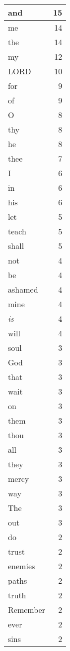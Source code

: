 \begin{center}
\begin{longtable}{l|r}
\hline \hline
\endlastfoot
and & 15 \\ \hline
me & 14 \\ \hline
the & 14 \\ \hline
my & 12 \\ \hline
LORD & 10 \\ \hline
for & 9 \\ \hline
of & 9 \\ \hline
O & 8 \\ \hline
thy & 8 \\ \hline
he & 8 \\ \hline
thee & 7 \\ \hline
I & 6 \\ \hline
in & 6 \\ \hline
his & 6 \\ \hline
let & 5 \\ \hline
teach & 5 \\ \hline
shall & 5 \\ \hline
not & 4 \\ \hline
be & 4 \\ \hline
ashamed & 4 \\ \hline
mine & 4 \\ \hline
\emph{is} & 4 \\ \hline
will & 4 \\ \hline
soul & 3 \\ \hline
God & 3 \\ \hline
that & 3 \\ \hline
wait & 3 \\ \hline
on & 3 \\ \hline
them & 3 \\ \hline
thou & 3 \\ \hline
all & 3 \\ \hline
they & 3 \\ \hline
mercy & 3 \\ \hline
way & 3 \\ \hline
The & 3 \\ \hline
out & 3 \\ \hline
do & 2 \\ \hline
trust & 2 \\ \hline
enemies & 2 \\ \hline
paths & 2 \\ \hline
truth & 2 \\ \hline
Remember & 2 \\ \hline
ever & 2 \\ \hline
sins & 2 \\ \hline

\end{longtable}
\end{center}
